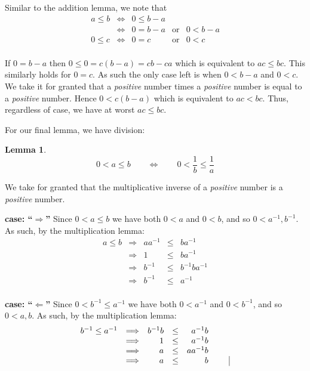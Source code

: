 \documentclass[twoside]{article}
\newtheorem{lemma}{Lemma}[section]
\newenvironment{proof}[1][Proof]{\begin{trivlist}
\item[\hskip \labelsep {\bfseries #1}]}{\end{trivlist}}
\newcommand{\qed}{\nobreak \ifvmode \relax \else
      \ifdim\lastskip<1.5em \hskip-\lastskip
      \hskip1.5em plus0em minus0.5em \fi \nobreak
      \vrule height0.5em width0.5em depth0.25em\fi}
\begin{document}
\begin{proof}
Similar to the addition lemma, we note that
$$ \begin{array}{rclll}
a\le b	&	\Longleftrightarrow	&	0\le b-a	&			&		\\
	&	\Longleftrightarrow	&	0=b-a		&	\mbox{or}	& 	0 < b-a	\\
0\le c	&	\Longleftrightarrow	&	0=c		&	\mbox{or}	& 	0 < c	\\
\end{array} $$

If $ 0=b-a $ then $ 0\le 0=c(b-a)=cb-ca $ which is equivalent to $ ac\le bc $. This similarly holds for $ 0=c $. As such the
only case left is when $ 0 < b-a $ and $ 0 < c $. We take it for granted that a \emph{positive} number times a \emph{positive}
number is equal to a \emph{positive} number. Hence $ 0 < c(b-a) $ which is equivalent to $ ac < bc $. Thus, regardless of case,
we have at worst $ ac\le bc $.\qed

\end{proof}

For our final lemma, we have division:

\begin{lemma} $$ 0<a\le b\qquad\Longleftrightarrow\qquad 0 < \frac{1}{b}\le\frac{1}{a} $$
\end{lemma}

\begin{proof}
We take for granted that the multiplicative inverse of a \emph{positive} number is a \emph{positive} number.

{\bfseries case: ``$ \Longrightarrow $''}
Since $ 0 < a\le b $ we have both $ 0 < a $ and $ 0 < b $, and so $ 0 < a^{-1}, b^{-1} $. As such, by the multiplication lemma:
$$ \begin{array}{lcrrrr}
a\le b	&	\Longrightarrow	&	aa^{-1}	&	\le	&	ba^{-1}		\\
	&	\Longrightarrow	&	1	&	\le	&	ba^{-1}		\\
	&	\Longrightarrow	&	b^{-1}	&	\le	&	b^{-1}ba^{-1}	\\
	&	\Longrightarrow	&	b^{-1}	&	\le	&	a^{-1}		\\
\end{array} $$

{\bfseries case: ``$ \Longleftarrow $''}
Since $ 0 < b^{-1}\le a^{-1} $ we have both $ 0 < a^{-1} $ and $ 0 < b^{-1} $, and so $ 0 < a, b $. As such, by the multiplication lemma:
$$ \begin{array}{lcrrrrr}
b^{-1}\le a^{-1}	&	\Longrightarrow	&	b^{-1}b	&	\le	&	a^{-1}b		&		\\
			&	\Longrightarrow	&	1	&	\le	&	a^{-1}b		&		\\
			&	\Longrightarrow	&	a	&	\le	&	aa^{-1}b	&		\\
			&	\Longrightarrow	&	a	&	\le	&	b		&	\qed	\\
\end{array} $$

\end{proof}
\end{document}
